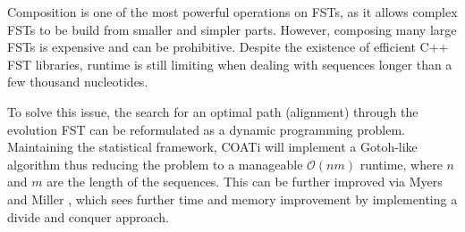 Composition is one of the most powerful operations on FSTs, as it allows complex
FSTs to be build from smaller and simpler parts.
However, composing many large FSTs is expensive and can be prohibitive.
Despite the existence of efficient C++ FST libraries, runtime is still limiting
when dealing with sequences longer than a few thousand nucleotides.

To solve this issue, the search for an optimal path (alignment) through the
evolution FST can be reformulated as a dynamic programming problem.
Maintaining the statistical framework, COATi will implement a Gotoh-like
algorithm thus reducing the problem to a manageable $\mathcal{O}(nm)$
runtime, where $n$ and $m$ are the length of the sequences.
This can be further improved via Myers and Miller \parencite{myers_miller_1988},
which sees further time and memory improvement by implementing a divide and
conquer approach.


